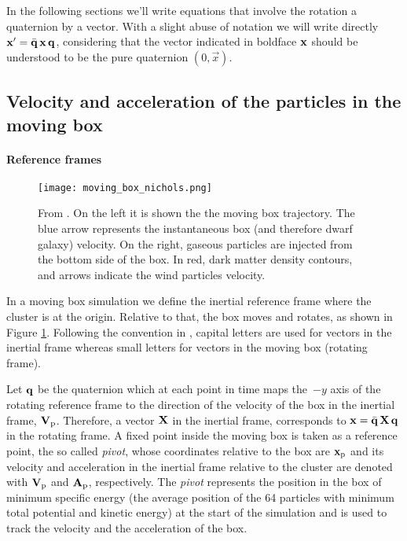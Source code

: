 In the following sections we'll write equations that involve the rotation a quaternion by a vector.
With a slight abuse of notation we will write directly $\boldsymbol{\mathbf{x}}' = \bar{\mathbf{q}}\, \boldsymbol{\mathbf{x}} \, \mathbf{q}$, considering that the vector indicated in boldface $\boldsymbol{\mathbf{x}}$ should be understood to be the pure quaternion $(0, \vec x)$.%



\subsection{Velocity and acceleration of the particles in the moving box} \label{sec:moving_box_vel_acc}
\paragraph{Reference frames}
\begin{figure}[H]
 \centering
 \texttt{[image: moving\_box\_nichols.png]}
 \caption{From \citet{Nichols2015}. On the left it is shown the the moving box trajectory. The blue arrow represents the instantaneous box (and therefore dwarf galaxy) velocity.
 On the right, gaseous particles are injected from the bottom side of the box. In red, dark matter density contours, and arrows indicate the wind particles velocity.}
 \label{fig:mb_nichols}
\end{figure}
In a moving box simulation we define the inertial reference frame where the cluster is at the origin.
Relative to that, the box moves and rotates, as shown in Figure \ref{fig:mb_nichols}.
Following the convention in \citet{Nichols2015}, capital letters are used for vectors in the inertial frame whereas small letters for vectors in the moving box (rotating frame).

Let $\mathbf{q}$ be the quaternion which at each point in time maps the~$-y$ axis of the rotating reference frame to the direction of the velocity of the box in the inertial frame, $\boldsymbol{\mathbf{V}}_{\mathrm p}$.
Therefore, a vector $\boldsymbol{\mathbf{X}}$ in the inertial frame, corresponds to $\boldsymbol{\mathbf{x}} = \bar{\mathbf{q}}\, \boldsymbol{\mathbf{X}} \,\mathbf{q} $ in the rotating frame.
A fixed point inside the moving box is taken as a reference point, the so called \emph{pivot}, whose coordinates relative to the box are $\boldsymbol{\mathbf{x}}_{\mathrm p}$ and its velocity and acceleration in the inertial frame relative to the cluster are denoted with $\boldsymbol{\mathbf{V}}_{\mathrm p}$ and $\boldsymbol{\mathbf{A}}_{\mathrm p}$, respectively.
The \emph{pivot} represents the position in the box of minimum specific energy (the average position of the 64 particles with minimum total potential and kinetic energy) at the start of the simulation and is used to track the velocity and the acceleration of the box.

